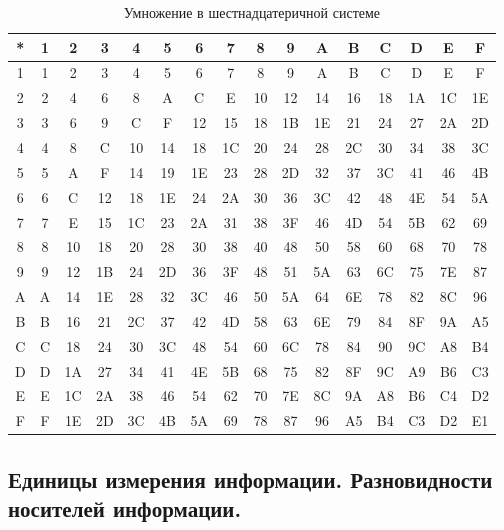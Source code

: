 \documentclass[a4paper]{article}
\begin{document}
\begin{table}[h!]
  \caption{Умножение в шестнадцатеричной системе}
  \begin{center}\label{tab:hexmul}
\begin{tabular}{|c|c|c|c|c|c|c|c|c|c|c|c|c|c|c|c|}
\hline
{*} & 1 & 2 & 3 & 4 & 5 & 6 & 7 & 8 & 9 & A & B & C & D & E & F\tabularnewline
\hline
1 & 1 & 2 & 3 & 4 & 5 & 6 & 7 & 8 & 9 & A & B & C & D & E & F\tabularnewline
\hline
2 & 2 & 4 & 6 & 8 & A & C & E & 10 & 12 & 14 & 16 & 18 & 1A & 1C & 1E\tabularnewline
\hline
3 & 3 & 6 & 9 & C & F & 12 & 15 & 18 & 1B & 1E & 21 & 24 & 27 & 2A & 2D\tabularnewline
\hline
4 & 4 & 8 & C & 10 & 14 & 18 & 1C & 20 & 24 & 28 & 2C & 30 & 34 & 38 & 3C\tabularnewline
\hline
5 & 5 & A & F & 14 & 19 & 1E & 23 & 28 & 2D & 32 & 37 & 3C & 41 & 46 & 4B\tabularnewline
\hline
6 & 6 & C & 12 & 18 & 1E & 24 & 2A & 30 & 36 & 3C & 42 & 48 & 4E & 54 & 5A\tabularnewline
\hline
7 & 7 & E & 15 & 1C & 23 & 2A & 31 & 38 & 3F & 46 & 4D & 54 & 5B & 62 & 69\tabularnewline
\hline
8 & 8 & 10 & 18 & 20 & 28 & 30 & 38 & 40 & 48 & 50 & 58 & 60 & 68 & 70 & 78\tabularnewline
\hline
9 & 9 & 12 & 1B & 24 & 2D & 36 & 3F & 48 & 51 & 5A & 63 & 6C & 75 & 7E & 87\tabularnewline
\hline
A & A & 14 & 1E & 28 & 32 & 3C & 46 & 50 & 5A & 64 & 6E & 78 & 82 & 8C & 96\tabularnewline
\hline
B & B & 16 & 21 & 2C & 37 & 42 & 4D & 58 & 63 & 6E & 79 & 84 & 8F & 9A & A5\tabularnewline
\hline
C & C & 18 & 24 & 30 & 3C & 48 & 54 & 60 & 6C & 78 & 84 & 90 & 9C & A8 & B4\tabularnewline
\hline
D & D & 1A & 27 & 34 & 41 & 4E & 5B & 68 & 75 & 82 & 8F & 9C & A9 & B6 & C3\tabularnewline
\hline
E & E & 1C & 2A & 38 & 46 & 54 & 62 & 70 & 7E & 8C & 9A & A8 & B6 & C4 & D2\tabularnewline
\hline
F & F & 1E & 2D & 3C & 4B & 5A & 69 & 78 & 87 & 96 & A5 & B4 & C3 & D2 & E1\tabularnewline
\hline
\end{tabular}
\end{center}
\end{table}


\subsection{Единицы измерения информации. Разновидности носителей информации.}
\end{document}
